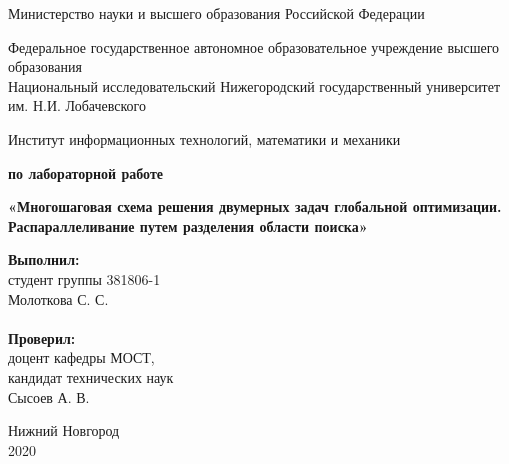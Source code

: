 \documentclass{report}
\begin{document}
\begin{titlepage}

\begin{center}
Министерство науки и высшего образования Российской Федерации
\end{center}

\begin{center}
Федеральное государственное автономное образовательное учреждение высшего образования \\
Национальный исследовательский Нижегородский государственный университет им. Н.И. Лобачевского
\end{center}

\begin{center}
Институт информационных технологий, математики и механики
\end{center}

\vspace{4em}

\begin{center}
\textbf{ по лабораторной работе} \\
\end{center}
\begin{center}
\textbf{\Large«Многошаговая схема решения двумерных задач глобальной оптимизации. Распараллеливание путем разделения области поиска»} \\
\end{center}

\vspace{4em}

\newbox{\lbox}
\newlength{\maxl}
\setlength{\maxl}{\wd\lbox}
\hfill\parbox{7cm}{
\hspace*{5cm}\hspace*{-5cm}\textbf{Выполнил:} \\ студент группы 381806-1 \\ Молоткова С. С.\\
\\
\hspace*{5cm}\hspace*{-5cm}\textbf{Проверил:}\\ доцент кафедры МОСТ, \\ кандидат технических наук \\ Сысоев А. В.\\
}
\vspace{\fill}

\begin{center} Нижний Новгород \\ 2020 \end{center}

\end{titlepage}
\end{document}
